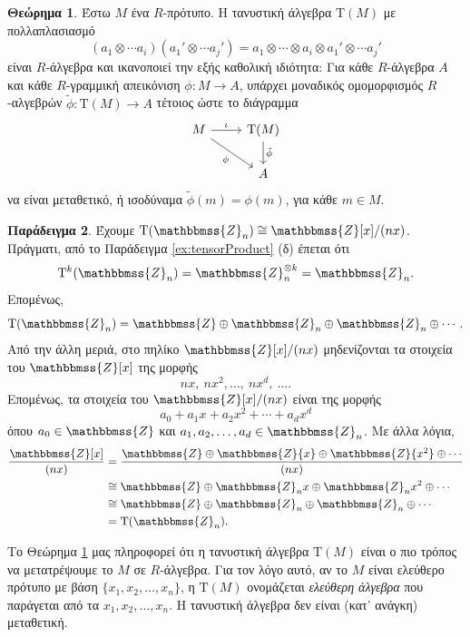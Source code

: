 \documentclass[12pt,a4paper,reqno]{amsart}
\theoremstyle{definition}
\newtheorem{theorem}{Θεώρημα}
\newtheorem{example}[theorem]{Παράδειγμα}
\theoremstyle{remark}
\numberwithin{theorem}{section}
\numberwithin{exercise}{section}
\numberwithin{equation}{section}
\newcommand{\ZZ}{\mathbbmss{Z}}
\newcommand{\rmT}{\mathrm{T}}
\renewcommand{\to}{\rightarrow}
\begin{document}
\begin{theorem}
    \label{thm:tensor_algebra}
    Έστω $M$ ένα $R$-πρότυπο. Η τανυστική άλγεβρα $\rmT(M)$ με πολλαπλασιασμό
    \[
    (a_1 \otimes \cdots a_i)(a_1' \otimes \cdots a_j') = a_1 \otimes \cdots \otimes a_i \otimes a_1' \otimes \cdots a_j'
    \]
    είναι $R$-άλγεβρα και ικανοποιεί την εξής καθολική ιδιότητα: Για κάθε $R$-άλγεβρα $A$ και κάθε $R$-γραμμική απεικόνιση $\phi : M \to A$, υπάρχει μοναδικός ομομορφισμός $R$-αλγεβρών $\tilde{\phi} : \rmT(M) \to A$ τέτοιος ώστε το διάγραμμα 
    \[
    \begin{tikzcd}
    M \arrow[r, "\iota"] \arrow[dr, "\phi"'] & \rmT(M) \arrow[d, "\tilde{\phi}"] \\
                                        & A
    \end{tikzcd}
    \]
    να είναι μεταθετικό, ή ισοδύναμα $\tilde{\phi}(m) = \phi(m)$, για κάθε $m \in M$.
\end{theorem}


\begin{example}
    \label{ex:tensor_algebra_2}
    Έχουμε $\rmT(\ZZ_n) \cong \ZZ[x]/(nx)$. Πράγματι, από το Παράδειγμα \ref{ex:tensorProduct} (δ) έπεται ότι 
    \[
    \rmT^k(\ZZ_n) = \ZZ_n^{\otimes{k}} = \ZZ_n.
    \]
    Επομένως, 
    \[
    \rmT(\ZZ_n) = \ZZ \oplus \ZZ_n \oplus \ZZ_n \oplus \cdots.
    \]
    Από την άλλη μεριά, στο πηλίκο $\ZZ[x]/(nx)$ μηδενίζονται τα στοιχεία του $\ZZ[x]$ της μορφής 
    \[
    nx, \ nx^2, \dots, \ nx^d, \ \dots.
    \]
    Επομένως, τα στοιχεία του $\ZZ[x]/(nx)$ είναι της μορφής 
    \[
    a_0 + a_1x + a_2x^2 + \cdots + a_dx^d
    \]
    όπου $a_0 \in \ZZ$ και $a_1, a_2, \dots, a_d \in \ZZ_n$. Με άλλα λόγια, 
    \begin{align*}
    \frac{\ZZ[x]}{(nx)} &= \frac{\ZZ \oplus \ZZ{x} \oplus \ZZ{x^2} \oplus \cdots}{(nx)} \\ 
    &\cong \ZZ \oplus \ZZ_n{x} \oplus \ZZ_n{x^2} \oplus \cdots \\
    &\cong \ZZ \oplus \ZZ_n \oplus \ZZ_n \oplus \cdots \\ 
    &= \rmT(\ZZ_n).
    \end{align*}
\end{example}

Το Θεώρημα \ref{thm:tensor_algebra} μας πληροφορεί ότι η τανυστική άλγεβρα $\rmT(M)$ είναι ο πιο  τρόπος να μετατρέψουμε το $M$ σε $R$-άλγεβρα. Για τον λόγο αυτό, αν το $M$ είναι ελεύθερο πρότυπο με βάση $\{x_1, x_2, \dots, x_n\}$, η $\rmT(M)$ ονομάζεται \emph{ελεύθερη άλγεβρα} που παράγεται από τα $x_1, x_2, \dots, x_n$. Η τανυστική άλγεβρα δεν είναι (κατ' ανάγκη) μεταθετική.
\end{document}
